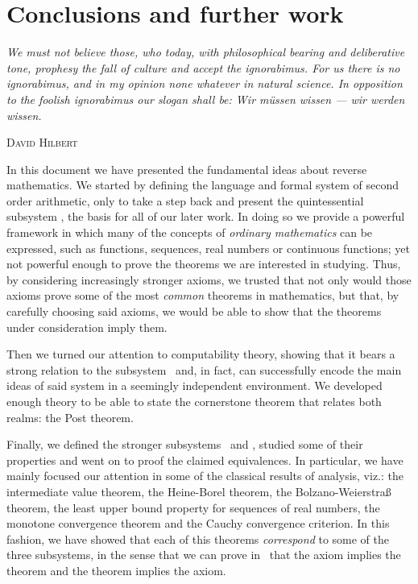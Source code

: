 \documentclass[../main.tex]{memoir}
\begin{document}
\chapter{Conclusions and further work}

\epigraph{
  \textit{
    We must not believe those, who today, with philosophical bearing and deliberative tone,
    prophesy the fall of culture and accept the ignorabimus. For us there is no ignorabimus,
    and in my opinion none whatever in natural science.
    In opposition to the foolish ignorabimus our slogan shall be: Wir müssen wissen — wir werden wissen.
  }
}{\textsc{David Hilbert}}

In this document we have presented the fundamental ideas about reverse mathematics. We started by defining the language and formal system of second order arithmetic, only to take a step back and present the quintessential subsystem \rca, the basis for all of our later work. In doing so we provide a powerful framework in which many of the concepts of \textit{ordinary mathematics} can be expressed, such as functions, sequences, real numbers or continuous functions; yet not powerful enough to prove the theorems we are interested in studying. Thus, by considering increasingly stronger axioms, we trusted that not only would those axioms prove some of the most \textit{common} theorems in mathematics, but that, by carefully choosing said axioms, we would be able to show that the theorems under consideration imply them.

Then we turned our attention to computability theory, showing that it bears a strong relation to the subsystem \rca\ and, in fact, can successfully encode the main ideas of said system in a seemingly independent environment. We developed enough theory to be able to state the cornerstone theorem that relates both realms: the Post theorem.

Finally, we defined the stronger subsystems \wkl\ and \aca, studied some of their properties and went on to proof the claimed equivalences. In particular, we have mainly focused our attention in some of the classical results of analysis, viz.: the intermediate value theorem, the Heine-Borel theorem, the Bolzano-Weierstra{\ss} theorem, the least upper bound property for sequences of real numbers, the monotone convergence theorem and the Cauchy convergence criterion. In this fashion, we have showed that each of this theorems \textit{correspond} to some of the three subsystems, in the sense that we can prove in \rca\ that the axiom implies the theorem and the theorem implies the axiom.
\end{document}
